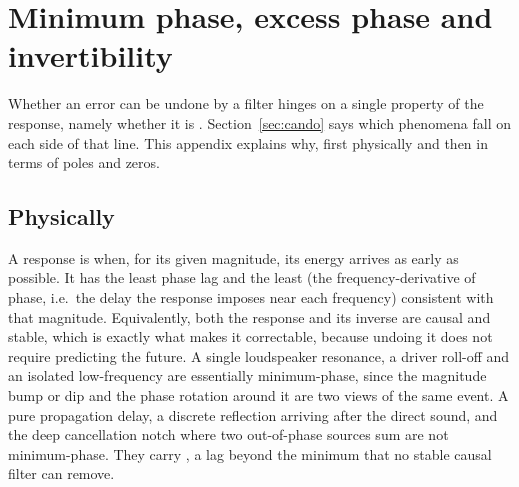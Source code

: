 \chapter{Minimum phase, excess phase and invertibility}\label{ch:minphasedef}

Whether an error can be undone by a filter hinges on a single property of the response, namely whether it is . Section~\ref{sec:cando} says which phenomena fall on each side of that line. This appendix explains why, first physically and then in terms of poles and zeros.

\section{Physically}
A response is  when, for its given magnitude, its energy arrives as early as possible. It has the least phase lag and the least  (the frequency-derivative of phase, i.e.\ the delay the response imposes near each frequency) consistent with that magnitude. Equivalently, both the response and its inverse are causal and stable, which is exactly what makes it correctable, because undoing it does not require predicting the future. A single loudspeaker resonance, a driver roll-off and an isolated low-frequency  are essentially minimum-phase, since the magnitude bump or dip and the phase rotation around it are two views of the same event. A pure propagation delay, a discrete reflection arriving after the direct sound, and the deep cancellation notch where two out-of-phase sources sum are not minimum-phase. They carry , a lag beyond the minimum that no stable causal filter can remove.

